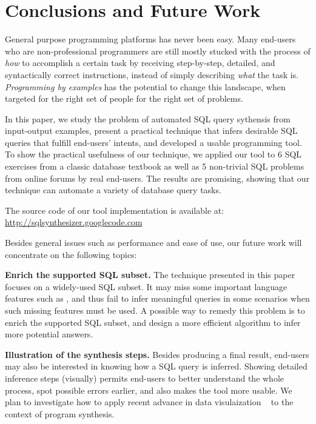 \section{Conclusions and Future Work}
\label{sec:conclusion}

General purpose programming platforms has never been easy. Many end-users
who are non-professional programmers are still mostly stucked with the process
of \textit{how} to accomplish a certain task by receiving 
step-by-step, detailed, and syntactically correct instructions, instead of simply describing
\textit{what} the task is. \textit{Programming by examples} has the potential
to change this landscape, when targeted for the right set of people for the
right set of problems.

In this paper, we study the problem of automated SQL query sythensis
from input-output examples, present a practical technique that
infers desirable SQL queries that fulfill end-users' intents, and
developed a usable programming tool.
To show the practical usefulness of our technique, we applied our tool
to 6 SQL exercises from a classic database textbook as well as
5 non-trivial SQL problems from online forums by real end-users. 
The results are promising, showing that our technique can automate a variety of database
query tasks.

The source code of our tool implementation is available at: \\
\url{http://sqlsynthesizer.googlecode.com}

\vspace{1mm}

Besides general issues such as performance and ease of use, our future
work will concentrate on the following topics:

\textbf{Enrich the supported SQL subset.} The technique 
presented in this paper focuses on a widely-used SQL subset.
It may miss some important language features such as
, and thus fail to infer meaningful queries
in some scenarios when such missing features must be used.
A possible way to remedy this problem is to enrich the
supported SQL subset, and design a more efficient algorithm
to infer more potential answers.

\textbf{Illustration of the synthesis steps.} Besides
producing a final result, end-users may also be interested in knowing
how a SQL query is inferred.  Showing detailed inference steps (visually) permits
end-users to better understand the whole process, spot possible errors earlier,
and also makes the tool more usable. We
plan to investigate how to apply recent advance in data visulaization
~\cite{Kandel:2011}
to the context of program synthesis.

